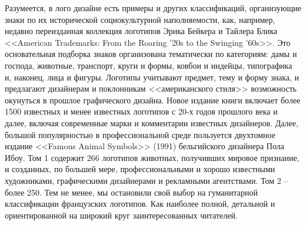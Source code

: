 Разумеется, в лого дизайне есть примеры и других классификаций,
организующие знаки по их исторической социокультурной наполняемости, как,
например, недавно переизданная коллекция логотипов Эрика Бейкера и Тайлера
Блика <<American Trademarks: From the Roaring '20s to the Swinging '60s>>. %
Это основательная подборка знаков организована тематически по категориям:
дамы и господа, животные, транспорт, круги и формы, ковбои и индейцы,
типографика и, наконец, лица и фигуры. Логотипы учитывают предмет, тему и
форму знака, и предлагают дизайнерам и поклонникам <<американского стиля>>
возможность окунуться в прошлое графического дизайна. Новое издание книги
включает более 1500 известных и менее известных логотипов с 20-х годов
прошлого века и далее, включая современные марки и комментарии известных
дизайнеров. Далее, большой популярностью в профессиональной среде пользуется
двухтомное издание <<Famous Animal Symbols>> (1991) бельгийского дизайнера Пола
Ибоу. %
Том 1 содержит 266 логотипов животных, получивших мировое признание, и
созданных, по большей мере, профессиональными и хорошо известными художниками,
графическими дизайнерами и рекламными агентствами. Том 2 -- более 250. Тем не
менее, мы остановили свой выбор на гуманитарной классификации французских
логотипов. Как наиболее полной, детальной и ориентированной на широкий круг
заинтересованных читателей.

